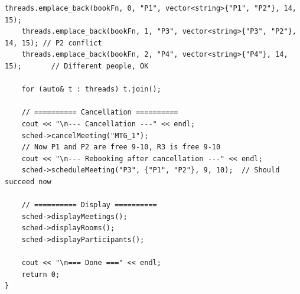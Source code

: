 \documentclass[11pt,a4paper]{article}
\begin{document}
\begin{lstlisting}[title={\texttt{main.cpp}}]
    threads.emplace_back(bookFn, 0, "P1", vector<string>{"P1", "P2"}, 14, 15);
    threads.emplace_back(bookFn, 1, "P3", vector<string>{"P3", "P2"}, 14, 15); // P2 conflict
    threads.emplace_back(bookFn, 2, "P4", vector<string>{"P4"}, 14, 15);       // Different people, OK

    for (auto& t : threads) t.join();

    // ========== Cancellation ==========
    cout << "\n--- Cancellation ---" << endl;
    sched->cancelMeeting("MTG_1");
    // Now P1 and P2 are free 9-10, R3 is free 9-10
    cout << "\n--- Rebooking after cancellation ---" << endl;
    sched->scheduleMeeting("P3", {"P1", "P2"}, 9, 10);  // Should succeed now

    // ========== Display ==========
    sched->displayMeetings();
    sched->displayRooms();
    sched->displayParticipants();

    cout << "\n=== Done ===" << endl;
    return 0;
}
\end{lstlisting}
\end{document}
